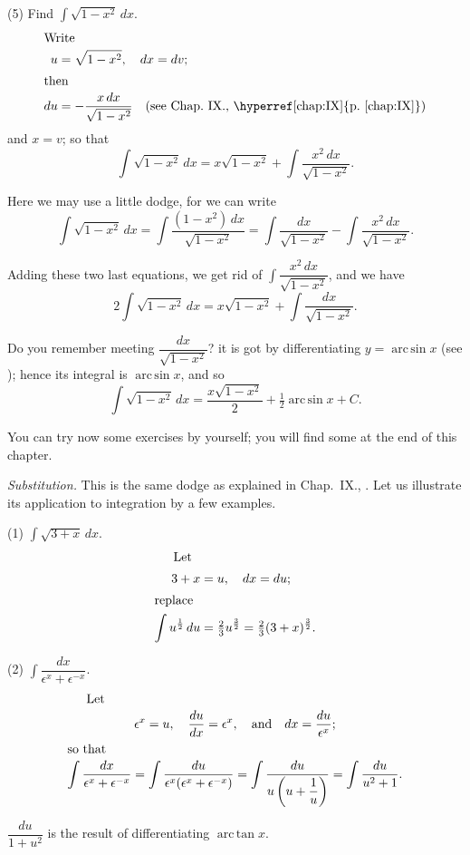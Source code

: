 \documentclass[12pt]{book}[2005/09/16]
\newcommand{\ds}{\displaystyle}
\newcommand{\Paragraph}[1]{\medskip\pagebreak[1]\par\textit{#1}}
\newcommand{\DPPageSep}[2]{\Pagelabel{#2}}
\newcommand{\Pagelabel}[1]
  {\phantomsection\label{#1}}
\newcommand{\Pageref}[2][p.]{%
  \ifthenelse{\not\equal{#1}{}}{%
    \hyperref[#2]{#1~\pageref{#2}}%
  }{%
    \hyperref[#2]{\pageref{#2}}%
  }%
}
\newcommand{\efrac}[2]{\frac{#1}{#2}}
\DeclareMathOperator{\Arcsin}{arc\,sin}
\renewcommand{\arcsin}{\Arcsin}
\DeclareMathOperator{\Arctan}{arc\,tan}
\renewcommand{\arctan}{\Arctan}
\begin{document}
(5) Find $\ds\int \sqrt{1-x^2}\, dx$.
\begin{align*}
\intertext{Write}
u &= \sqrt{1-x^2},\quad dx=dv;  \\
\intertext{then}
du &= -\frac{x\, dx}{\sqrt{1-x^2}}\quad \text{(see Chap.~IX., \Pageref{chap:IX})}
\end{align*}
and $x=v$; so that
\[
\int \sqrt{1-x^2}\, dx=x \sqrt{1-x^2} + \int \frac{x^2\, dx}{\sqrt{1-x^2}}.
\]

Here we may use a little dodge, for we can write
\[
\int \sqrt{1-x^2}\, dx
  = \int \frac{(1-x^2)\, dx}{\sqrt{1-x^2}}
  = \int \frac{dx}{\sqrt{1-x^2}} - \int \frac{x^2\, dx}{\sqrt{1-x^2}}.
\]

Adding these two last equations, we get rid of
$\ds\int \dfrac{x^2\, dx}{\sqrt{1-x^2}}$, and we have
\[
2 \int \sqrt{1-x^2}\, dx = x\sqrt{1-x^2} + \int \frac{dx}{\sqrt{1-x^2}}.
\]
\DPPageSep{241.png}{229}%

Do you remember meeting $\dfrac {dx}{\sqrt{1-x^2}}$? it is got by
differentiating $y=\arcsin x$ (see \Pageref{intex3}); hence its integral
is $\arcsin x$, and so
\[
\int \sqrt{1-x^2}\, dx = \frac{x \sqrt{1-x^2}}{2} + \tfrac{1}{2} \arcsin x +C.
\]

You can try now some exercises by yourself; you
will find some at the end of this chapter.

\Paragraph{Substitution.} This is the same dodge as explained
in Chap.~IX., \Pageref{chap:IX}. Let us illustrate its application
to integration by a few examples.

(1) $\ds\int \sqrt{3+x}\, dx$.
\begin{align*}
\intertext{\indent Let}
3+x &= u,\quad dx = du; \\
\intertext{replace}
\int u^{\efrac{1}{2}}\, du
  &= \tfrac{2}{3} u^{\efrac{3}{2}} = \tfrac{2}{3}(3+x)^{\efrac{3}{2}}.
\end{align*}

(2) $\ds\int \dfrac{dx}{\epsilon^x+\epsilon^{-x}}$.
\begin{gather*}
\intertext{\indent Let}
\epsilon^x = u,\quad \frac{du}{dx} = \epsilon^x,\quad\text{and}\quad
dx = \frac{du}{\epsilon^x}; \\
\intertext{so that}
\int \frac{dx}{\epsilon^x+\epsilon^{-x}}
  = \int \frac{du}{\epsilon^x(\epsilon^x+\epsilon^{-x})}
  = \int \frac{du}{u\left(u + \dfrac{1}{u}\right)}
  = \int \frac{du}{u^2+1}.
\end{gather*}

$\dfrac{du}{1+u^2}$ is the result of differentiating $\arctan x$.
\end{document}
